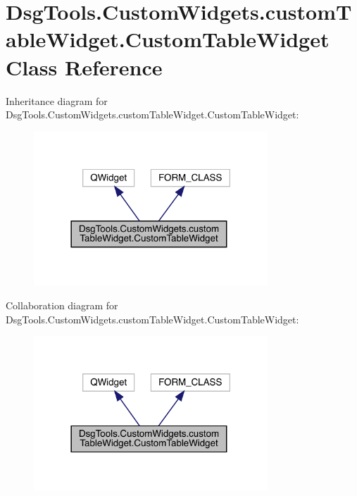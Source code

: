 \hypertarget{class_dsg_tools_1_1_custom_widgets_1_1custom_table_widget_1_1_custom_table_widget}{}\section{Dsg\+Tools.\+Custom\+Widgets.\+custom\+Table\+Widget.\+Custom\+Table\+Widget Class Reference}
\label{class_dsg_tools_1_1_custom_widgets_1_1custom_table_widget_1_1_custom_table_widget}


Inheritance diagram for Dsg\+Tools.\+Custom\+Widgets.\+custom\+Table\+Widget.\+Custom\+Table\+Widget\+:
\nopagebreak
\begin{figure}[H]
\begin{center}
\leavevmode
\includegraphics[width=249pt]{class_dsg_tools_1_1_custom_widgets_1_1custom_table_widget_1_1_custom_table_widget__inherit__graph}
\end{center}
\end{figure}


Collaboration diagram for Dsg\+Tools.\+Custom\+Widgets.\+custom\+Table\+Widget.\+Custom\+Table\+Widget\+:
\nopagebreak
\begin{figure}[H]
\begin{center}
\leavevmode
\includegraphics[width=249pt]{class_dsg_tools_1_1_custom_widgets_1_1custom_table_widget_1_1_custom_table_widget__coll__graph}
\end{center}
\end{figure}
